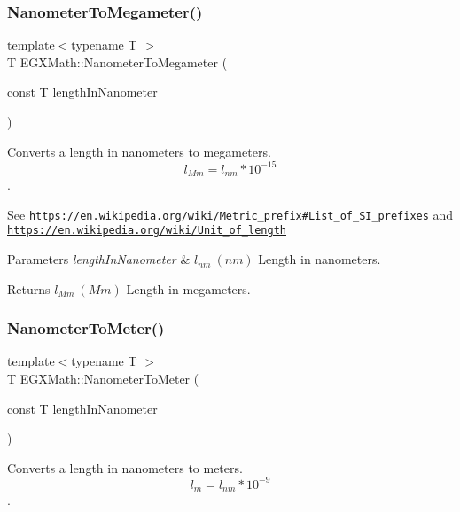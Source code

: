\subsubsection{\texorpdfstring{Nanometer\+To\+Megameter()}{NanometerToMegameter()}}
{\footnotesize\ttfamily template$<$typename T $>$ \\
T E\+G\+X\+Math\+::\+Nanometer\+To\+Megameter (\begin{DoxyParamCaption}\item[{const T}]{length\+In\+Nanometer }\end{DoxyParamCaption})}



Converts a length in nanometers to megameters. \[ l_{Mm}=l_{nm} * 10^{-15} \]. 

See \href{https://en.wikipedia.org/wiki/Metric_prefix#List_of_SI_prefixes}{\tt https\+://en.\+wikipedia.\+org/wiki/\+Metric\+\_\+prefix\#\+List\+\_\+of\+\_\+\+S\+I\+\_\+prefixes} and \href{https://en.wikipedia.org/wiki/Unit_of_length}{\tt https\+://en.\+wikipedia.\+org/wiki/\+Unit\+\_\+of\+\_\+length} 
\begin{DoxyParams}{Parameters}
{\em length\+In\+Nanometer} & $ l_{nm}\ (nm)$ Length in nanometers. \\
\hline
\end{DoxyParams}
\begin{DoxyReturn}{Returns}
$ l_{Mm}\ (Mm)$ Length in megameters. 
\end{DoxyReturn}
\mbox{\label{group___e_g_x_math-_conversions-_length_conversions-_nanometer-_s_i_ga2ceddcda2954e4bb6cf1216ce4edc160}} 
\subsubsection{\texorpdfstring{Nanometer\+To\+Meter()}{NanometerToMeter()}}
{\footnotesize\ttfamily template$<$typename T $>$ \\
T E\+G\+X\+Math\+::\+Nanometer\+To\+Meter (\begin{DoxyParamCaption}\item[{const T}]{length\+In\+Nanometer }\end{DoxyParamCaption})}



Converts a length in nanometers to meters. \[ l_{m}=l_{nm} * 10^{-9} \]. 


